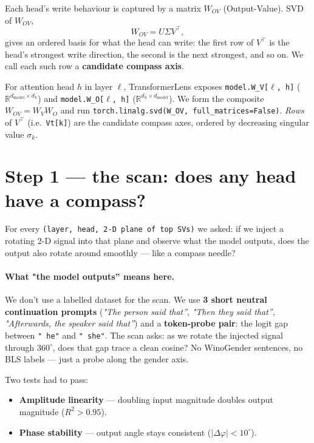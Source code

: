 \documentclass[11pt]{article}
\begin{document}
Each head's write behaviour is captured by a matrix $W_{OV}$ (Output-Value).
SVD of $W_{OV}$,
\[
    W_{OV} = U \Sigma V^\top,
\]
gives an ordered basis for what the head can write: the first row of
$V^\top$ is the head's strongest write direction, the second is the
next strongest, and so on. We call each such row a
\textbf{candidate compass axis}.

\begin{tcolorbox}[techbox, title=Technical: how $W_{OV}$ is computed]
For attention head $h$ in layer $\ell$, TransformerLens exposes
\texttt{model.W\_V[$\ell$, h]} ($\mathbb{R}^{d_\text{model}\times d_h}$)
and \texttt{model.W\_O[$\ell$, h]} ($\mathbb{R}^{d_h\times d_\text{model}}$).
We form the composite $W_{OV} = W_V W_O$ and run
\texttt{torch.linalg.svd(W\_OV, full\_matrices=False)}.
\emph{Rows} of $V^\top$ (i.e.\ \texttt{Vt[k]}) are the candidate compass
axes, ordered by decreasing singular value $\sigma_k$.
\end{tcolorbox}

\section{Step 1 --- the scan: does any head have a compass?}
For every \texttt{(layer, head, 2-D plane of top SVs)} we asked: if we
inject a rotating 2-D signal into that plane and observe what the
model outputs, does the output also rotate around smoothly --- like a
compass needle?

\paragraph{What "the model outputs'' means here.} We don't use a labelled
dataset for the scan. We use \textbf{3 short neutral continuation
prompts} (\emph{"The person said that''}, \emph{"Then they said that''},
\emph{"Afterwards, the speaker said that''}) and a \textbf{token-probe
pair}: the logit gap between \texttt{" he"} and \texttt{" she"}. The
scan asks: as we rotate the injected signal through $360^\circ$, does
that gap trace a clean cosine? No WinoGender sentences, no BLS labels
--- just a probe along the gender axis.

Two tests had to pass:
\begin{itemize}[leftmargin=*,nosep]
    \item \textbf{Amplitude linearity} --- doubling input magnitude doubles output magnitude ($R^2 > 0.95$).
    \item \textbf{Phase stability} --- output angle stays consistent ($|\Delta\varphi| < 10^\circ$).
\end{itemize}
\end{document}
